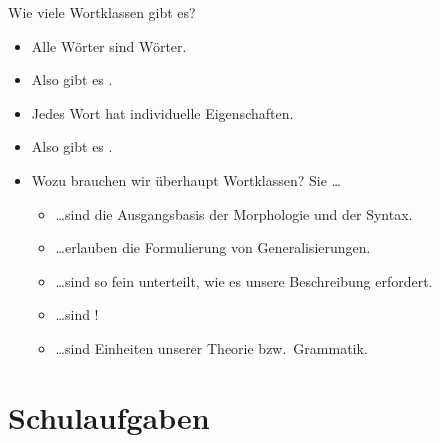 \begin{frame}
  {Wie viele Wortklassen gibt es?}
  \pause
  \begin{itemize}[<+->]
    \item Alle Wörter sind \alert{Wörter}.
    \item Also gibt es .
      \Zeile
    \item Jedes Wort hat \alert{individuelle Eigenschaften}.
    \item Also gibt es .
      \Zeile
    \item Wozu brauchen wir überhaupt Wortklassen? Sie \ldots\\
      \Viertelzeile
      \begin{itemize}[<+->]
        \item \dots sind \alert{die Ausgangsbasis der Morphologie und der Syntax}.
        \item \dots erlauben die Formulierung von \alert{Generalisierungen}.
        \item \dots sind so fein unterteilt, wie es unsere Beschreibung erfordert.
        \item \dots sind !
        \item \dots sind \alert{Einheiten unserer Theorie bzw.\ Grammatik}.
      \end{itemize}
  \end{itemize}
\end{frame}


\section{Schulaufgaben}

